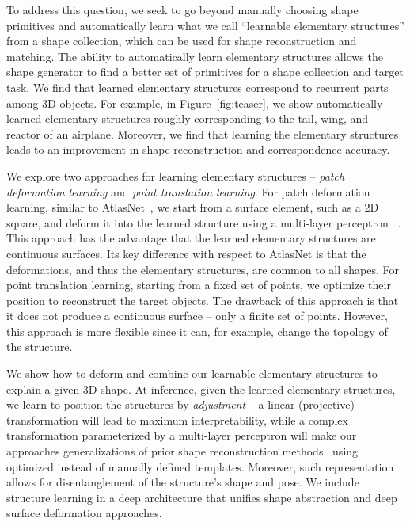 \documentclass{article}
\begin{document}
To address this question, we seek to go beyond manually choosing shape primitives and automatically learn what we call ``learnable elementary structures'' from a shape collection, which can be used for shape reconstruction and matching. 
The ability to automatically learn elementary structures allows the shape generator to find a better set of primitives for a shape collection and target task. We find that learned elementary structures correspond to recurrent parts among 3D objects. 
For example, in Figure~\ref{fig:teaser}, we show automatically learned elementary structures roughly corresponding to the tail, wing, and reactor of an airplane. 
Moreover, we find that learning the elementary structures leads to an improvement in shape reconstruction and correspondence accuracy.

We explore two approaches for learning elementary structures -- {\it patch deformation learning} and {\it point translation learning}. For patch deformation learning, similar to AtlasNet~\cite{groueix2018}, we start from a surface element, such as a 2D square, and deform it into the learned structure using a multi-layer perceptron ~\cite{rosenblatt1958perceptron}. This approach has the advantage that the learned elementary structures are continuous surfaces. Its key difference with respect to AtlasNet is that the deformations, and thus the elementary structures, are common to all shapes.
For point translation learning, starting from a fixed set of points, we optimize their position to reconstruct the target objects. The drawback of this approach is that it does not produce a continuous surface -- only a finite set of points. However, this approach is more flexible since it can, for example, change the topology of the structure. 

We show how to deform and combine our learnable elementary structures to explain a given 3D shape. At inference, given the learned elementary structures, we learn to position the structures by {\it adjustment} -- a linear (projective) transformation will lead to maximum interpretability, while a complex transformation parameterized by a multi-layer perceptron will make our approaches generalizations of prior shape reconstruction methods~\cite{groueix2018,groueix2018b} using optimized instead of manually defined templates. 
Moreover, such representation allows for disentanglement of the structure's shape and pose. We include structure learning in a deep architecture that unifies shape abstraction and deep surface deformation approaches. 
\end{document}
